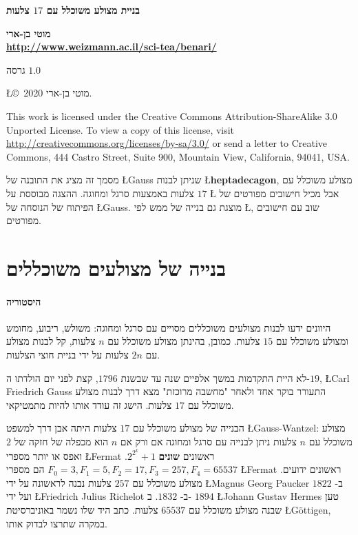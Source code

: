 \documentclass[11pt,a4paper]{article}
\begin{document}
\thispagestyle{empty}
\begin{center}
\textbf{\LARGE בניית מצולע משוכלל עם 
$17$
צלעות}

\bigskip

\textbf{\Large מוטי בן-ארי\\\bigskip\url{http://www.weizmann.ac.il/sci-tea/benari/}}
\smallskip

גרסה
$1.0$
\end{center}

\begin{footnotesize}
\begin{center}
\L{\copyright{}\  2020} מוטי בן-ארי. 
\end{center}
This work is licensed under the Creative Commons Attribution-ShareAlike 3.0 Unported License. To view a copy of this license, visit \url{http://creativecommons.org/licenses/by-sa/3.0/} or send a letter to Creative Commons, 444 Castro Street, Suite 900, Mountain View, California, 94041, USA.

\end{footnotesize}
מסמך זה מציג את התובנה של 
\L{Gauss}
שניתן לבנות 
\L{\textbf{heptadecagon}},
מצולע משוכלל עם 
$17$
צלעות באמצעות סרגל ומחוגה.
ההצגה מבוססת על
\L{\cite{jorg}}
אבל מכיל חישובים מפורטים של הפיתוח של הנוסחה של
\L{Gauss}.
מוצגת גם בנייה של ממש לפי
\L{\cite{callagy}},
שוב עם חישובים מפורטים.

\section{בנייה של מצולעים משוכללים}

\paragraph{היסטוריה}
היוונים ידעו לבנות מצולעים משוכללים מסויים  עם סרגל ומחוגה: משולש, ריבוע, מחומש ומצולע משוכלל עם $15$ צלעות.
כמובן, בהינתן מצולע משוכלל עם
$n$
צלעות, קל לבנות מצולע עם 
$2n$
צלעות על ידי בניית חוצי הצלעות.

לא היית התקדמות במשך אלפיים שנה עד שבשנת
$1796$,
קצת לפני יום הולדתו ה-$19$,
\L{Carl Friedrich Gauss}
התעורר בוקר אחד ולאחר "מחשבה מרוכזת" מצא דרך לבנות מצולע משוכלל עם 
$17$
צלעות. הישג זה עודד אותו להיות מתמטיקאי.

הבנייה של מצולע משוכלל עם 
$17$
צלעות היתה אבן דרך למשפט
\L{Gauss-Wantzel}:
מצולע משוכלל עם 
$n$
צלעות ניתן לבנייה עם סרגל ומחוגה אם ורק אם 
$n$
הוא מכפלה של חזקה של
$2$
ואפס או יותר מספרי 
\L{Fermat}
ראשונים
\textbf{שונים}
$2^{2^k}+1$. 
$F_0=3, F_1=5, F_2=17, F_3=257, F_4=65537$
הם מספרי 
\L{Fermat}
ראשונים ידועים. מצולע משוכלל עם
$257$
צלעות נבנה לראשונה על ידי
\L{Magnus Georg Paucker}
ב-%
$1822$
ועל ידי
\L{Friedrich Julius Richelot}
ב-%
$1832$.
ב-%
$1894$
\L{Johann Gustav Hermes}
טען שבנה מצולע משוכלל עם
$65537$
צלעות.
כתב היד שלו נשמר באוניברסיטת 
\L{G\"{o}ttigen},
במקרה שתרצו לבדוק אותו.
\end{document}
